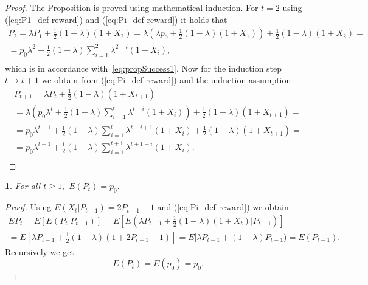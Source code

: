 \documentclass{amsart}
\theoremstyle{definition}
\theoremstyle{plain}
\newtheorem{prop}[thm]{\protect\propositionname}
\theoremstyle{plain}
\theoremstyle{plain}
\numberwithin{equation}{section}
\providecommand{\propositionname}{Proposition}
\begin{document}
    \begin{proof}
        The Proposition is proved using mathematical induction.
        For $t=2$ using (\ref{eq:P1_def-reward})
        and (\ref{eq:Pi_def-reward}) it holds that
        \begin{gather*}
            P_{2}=\lambda P_{1}+\frac{1}{2}(1-\lambda)(1+X_{2})=\lambda(\lambda p_{0}+\frac{1}{2}(1-\lambda)(1+X_{1}))+\frac{1}{2}(1-\lambda)(1+X_{2})=\\
            =p_{0}\lambda^{2}+\frac{1}{2}(1-\lambda)\sum_{i=1}^{2}\lambda^{2-i}(1+X_{i}),\\
        \end{gather*}
        which is in accordance with~\eqref{eq:propSuccess1}.
        Now for the
        induction step $t\rightarrow t+1$ we obtain from (\ref{eq:Pi_def-reward})
        and the induction assumption
        \begin{gather*}
            P_{t+1}=\lambda P_{t}+\frac{1}{2}(1-\lambda)(1+X_{t+1})=\\
            =\lambda(p_{0}\lambda^{t}+\frac{1}{2}(1-\lambda)\sum_{i=1}^{t}\lambda^{t-i}(1+X_{i}))+\frac{1}{2}(1-\lambda)(1+X_{t+1})=\\
            =p_{0}\lambda^{t+1}+\frac{1}{2}(1-\lambda)\sum_{i=1}^{t}\lambda^{t-i+1}(1+X_{i})+\frac{1}{2}(1-\lambda)(1+X_{t+1})=\\
            =p_{0}\lambda^{t+1}+\frac{1}{2}(1-\lambda)\sum_{i=1}^{t+1}\lambda^{t+1-i}(1+X_{i}).\\
        \end{gather*}
    \end{proof}

    \begin{prop}
        \label{PropReward2}For all $t\geq1,$ $E(P_{t})=p_{0}.$
    \end{prop}
    \begin{proof}
        Using $E(X_{t}|P_{t-1})=2P_{t-1}-1$ and (\ref{eq:Pi_def-reward})
        we obtain
        \begin{gather*}
            EP_{t}=E[E(P_{t}|P_{t-1})]=E[E(\lambda P_{t-1}+\frac{1}{2}(1-\lambda)(1+X_{t})|P_{t-1})]=\\
            =E[\lambda P_{t-1}+\frac{1}{2}(1-\lambda)(1+2P_{t-1}-1)]=E[\lambda P_{t-1}+(1-\lambda)P_{t-1})=E(P_{t-1}).
        \end{gather*}
        Recursively we get
        \begin{equation}
            E(P_{t})=E(p_{0})=p_{0}.\label{eq:EPt-reward-formula}
        \end{equation}
    \end{proof}
\end{document}
